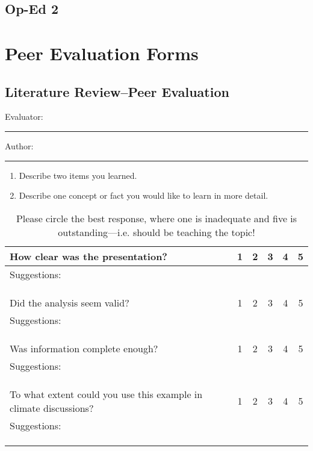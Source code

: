 \documentclass{article}\usepackage[]{graphicx}\usepackage[]{color}
\begin{document}


\subsection{Op-Ed 2}



\clearpage
\newpage
\section{Peer Evaluation Forms}

\subsection{Literature Review--Peer Evaluation}

\bigskip
Evaluator: \rule{7cm}{0.4pt}

\bigskip

\noindent Author: \rule{7cm}{0.4pt}

\begin{enumerate}
 \setlength\itemsep{4em}
  \item Describe two items you learned.
  \item Describe one concept or fact you would like to learn in more detail.
\end{enumerate}


\begin{table}[ht!]
\caption{Please circle the best response, where one is inadequate and five is outstanding---i.e. should be teaching the topic!}
\begin{tabular}{|p{4in}|ccccc|}\hline
How clear was the presentation?     & 1 & 2 & 3 & 4 & 5 \\ \hline
Suggestions: &&&&& \\ &&&&& \\ &&&&& \\
&&&&& \\ \hline
Did the analysis seem valid?        & 1 & 2 & 3 & 4 & 5 \\ \hline
Suggestions: &&&&& \\ &&&&& \\ &&&&& \\
&&&&& \\ \hline
Was information complete enough?            & 1 & 2 & 3 & 4 & 5 \\ \hline
Suggestions: &&&&& \\ &&&&& \\ &&&&& \\
&&&&& \\ \hline
To what extent could you use this example in climate discussions?            & 1 & 2 & 3 & 4 & 5 \\ \hline
Suggestions: &&&&& \\ &&&&& \\ &&&&& \\
&&&&& \\ \hline
\end{tabular}
\end{table}
\end{document}
